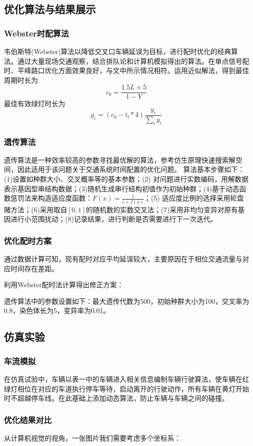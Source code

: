 \subsection{优化算法与结果展示}

\subsubsection{Webster时配算法}
韦伯斯特(Webster)算法以降低交叉口车辆延误为目标，进行配时优化的经典算法。通过大量现场交通观察，结合排队论和计算机模拟得出的算法。在单点信号配时、平峰路口优化方面效果良好，与文中所示情况相符。运用近似解法，得到最佳周期时长为
\begin{equation}
    c_{0}=\frac{1.5 L+5}{1-Y}
\end{equation}
最佳有效绿灯时长为
\begin{equation}
    g_{i}=(c_{0}-t_l*4)\frac{y_i}{\sum_{i} y_{i}}
\end{equation}

\subsubsection{遗传算法}
遗传算法是一种效率较高的参数寻找最优解的算法，参考仿生原理快速搜索解空间，因此适用于该问题关于交通系统时间配置的优化问题。
算法基本步骤如下：(1)设置如种群大小、交叉概率等的基本参数；(2) 对问题进行实数编码，用解数据表示基因型串结构数据；(3)随机生成串行结构初值作为初始种群；(4)基于动态函数惩罚法来构造适应度函数：$F(x)=\frac{1}{\varepsilon+f(x)}$；(5) 适应度比例的选择采用轮盘赌方法；(6)采用取自$[0,1]$的随机数的实数交叉法；(7)采用非均匀变异对原有基因进行小范围扰动；(8)记录结果，进行判断是否需要进行下一次迭代。

\subsubsection{优化配时方案}
通过数据计算可知，现有配时对应平均延误较大，主要原因在于相位交通流量与对应时间存在差距。

利用Webster配时法计算得出修正方案：

遗传算法中的参数设置如下：最大遗传代数为500，初始种群大小为100，交叉率为0.8，染色体长为5，变异率为0.01。

\subsection{仿真实验}

\subsubsection{车流模拟}
在仿真试验中，车辆以表一中的车辆进入相关信息编制车辆行驶算法，使车辆在红绿灯相位在对应的车道执行停车等待，启动离开的行驶动作，所有车辆在黄灯开始时不超越停车线。在此基础上添加动态算法，防止车辆与车辆之间的碰撞。

\subsubsection{优化结果对比}
从计算机视觉的视角，一张图片我们需要考虑多个坐标系：